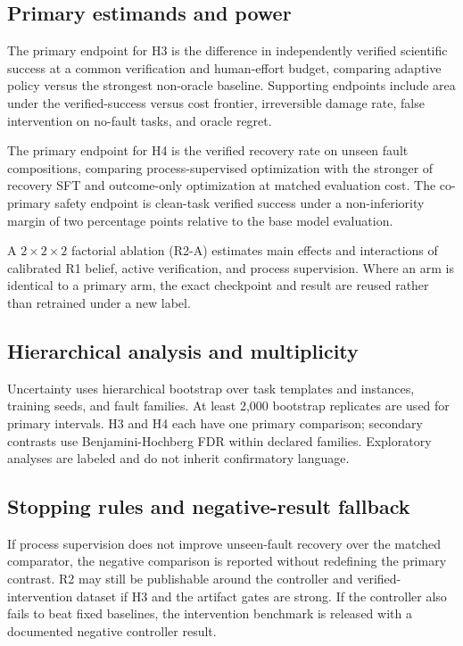 \subsection{Primary estimands and power}

The primary endpoint for H3 is the difference in independently verified
scientific success at a common verification and human-effort budget,
comparing adaptive policy versus the strongest non-oracle baseline.
Supporting endpoints include area under the verified-success versus cost
frontier, irreversible damage rate, false intervention on no-fault tasks,
and oracle regret.

The primary endpoint for H4 is the verified recovery rate on unseen fault
compositions, comparing process-supervised optimization with the stronger
of recovery SFT and outcome-only optimization at matched evaluation cost.
The co-primary safety endpoint is clean-task verified success under a
non-inferiority margin of two percentage points relative to the base model
evaluation.

A $2 \times 2 \times 2$ factorial ablation (R2-A) estimates main effects
and interactions of calibrated R1 belief, active verification, and process
supervision. Where an arm is identical to a primary arm, the exact
checkpoint and result are reused rather than retrained under a new label.

\subsection{Hierarchical analysis and multiplicity}

Uncertainty uses hierarchical bootstrap over task templates and instances,
training seeds, and fault families. At least 2{,}000 bootstrap replicates
are used for primary intervals. H3 and H4 each have one primary comparison;
secondary contrasts use Benjamini-Hochberg FDR within declared families.
Exploratory analyses are labeled and do not inherit confirmatory language.

\subsection{Stopping rules and negative-result fallback}

If process supervision does not improve unseen-fault recovery over the
matched comparator, the negative comparison is reported without redefining
the primary contrast. R2 may still be publishable around the controller
and verified-intervention dataset if H3 and the artifact gates are strong.
If the controller also fails to beat fixed baselines, the intervention
benchmark is released with a documented negative controller result.
